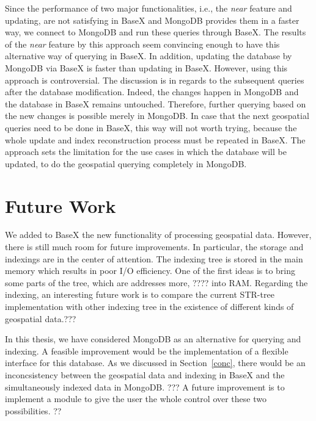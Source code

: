 \documentclass[a4paper,12pt]{article}
\begin{document}
Since the performance of two major functionalities, i.e., the \textit{near} feature and updating, are not satisfying in BaseX and MongoDB provides them in a faster way, we connect to MongoDB and run these queries through BaseX. The results of the \textit{near} feature by this approach seem convincing enough to have this alternative way of querying in BaseX. In addition, updating the database by MongoDB via BaseX is faster than updating in BaseX. However, using this approach is controversial. The discussion is in regards to the subsequent queries after the database modification. Indeed, the changes happen in MongoDB and the database in BaseX remains untouched. Therefore, further querying based on the new changes is possible merely in MongoDB. In case that the next geospatial queries need to be done in BaseX, this way will not worth trying, because the whole update and index reconstruction process must be repeated in BaseX. The approach sets the limitation for the use cases in which the database will be updated, to do the geospatial querying completely in MongoDB.


\newpage
\section{Future Work}
\label{s.future}
We added to BaseX the new functionality of processing geospatial data.
However, there is still much room for future improvements. 
In particular, the storage and indexings are in the center of attention.
The indexing tree is stored in the main memory which results in poor I/O efficiency.%
One of the first ideas is to bring some parts of the tree, which are addresses more, ????
into RAM. Regarding the indexing, an interesting future work is to compare 
the current STR-tree implementation with other indexing tree in the existence of
different kinds of geospatial data.???

In this thesis, we have considered MongoDB as an alternative for querying and indexing.
A feasible improvement would be the implementation of a flexible interface
for this database. As we discussed in Section~\ref{conc}, 
there would be an inconcsistency between 
the geospatial data and indexing in BaseX and
the simultaneously indexed data in MongoDB. ??? A future improvement is to 
implement a module to give the user the whole control over these two possibilities. ??

\newpage


\newpage
\listoffigures
\newpage
\listoftables
\newpage
\lstlistoflistings
\end{document}
